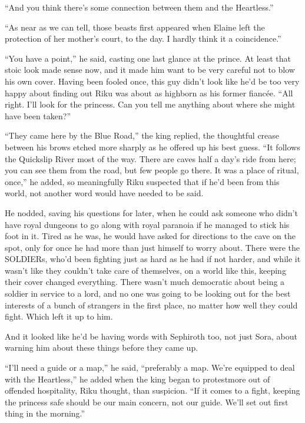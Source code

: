 ``And you think there's some connection between them and the Heartless.''

``As near as we can tell, those beasts first appeared when Elaine left the protection of her mother's court, to the day. I hardly think it a coincidence.''

``You have a point,'' he said, casting one last glance at the prince. At least that stoic look made sense now, and it made him want to be very careful not to blow his own cover. Having been fooled once, this guy didn't look like he'd be too very happy about finding out Riku was about as highborn as his former fiancée. ``All right. I'll look for the princess. Can you tell me anything about where she might have been taken?''

``They came here by the Blue Road,'' the king replied, the thoughtful crease between his brows etched more sharply as he offered up his best guess. ``It follows the Quickslip River most of the way. There are caves half a day's ride from here; you can see them from the road, but few people go there. It was a place of ritual, once,'' he added, so meaningfully Riku suspected that if he'd been from this world, not another word would have needed to be said.

He nodded, saving his questions for later, when he could ask someone who didn't have royal dungeons to go along with royal paranoia if he managed to stick his foot in it. Tired as he was, he would have asked for directions to the cave on the spot, only for once he had more than just himself to worry about. There were the SOLDIERs, who'd been fighting just as hard as he had if not harder, and while it wasn't like they couldn't take care of themselves, on a world like this, keeping their cover changed everything. There wasn't much democratic about being a soldier in service to a lord, and no one was going to be looking out for the best interests of a bunch of strangers in the first place, no matter how well they could fight. Which left it up to him.

And it looked like he'd be having words with Sephiroth too, not just Sora, about warning him about these things before they came up.

``I'll need a guide or a map,'' he said, ``preferably a map. We're equipped to deal with the Heartless,'' he added when the king began to protest\textemdash more out of offended hospitality, Riku thought, than suspicion. ``If it comes to a fight, keeping the princess safe should be our main concern, not our guide. We'll set out first thing in the morning.''

